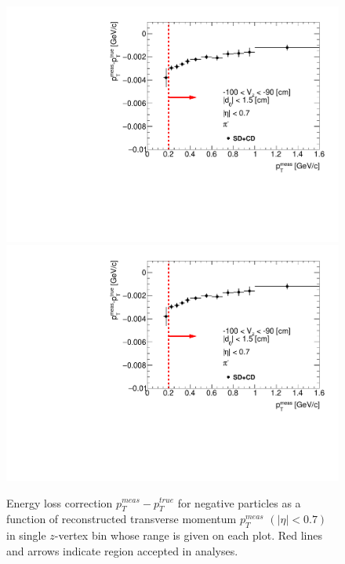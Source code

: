 \begin{figure}[H]
\caption[Energy loss correction for negative particles as a function of reconstructed transverse momentum $p_T^{meas}$.]{Energy loss correction $p_T^{meas}-p_T^{true}$ for negative particles as a function of reconstructed transverse momentum $p_T^{meas}$ $\left(|\eta|<0.7\right)$ in single $z$-vertex bin whose range is given on each plot. Red lines and arrows indicate region accepted in analyses.}\label{fig:energyLossPrimaryNegative}
\parbox{0.329\textwidth}{
  \includegraphics[width=\linewidth,page=123]{graphics/energyLoss/energyLoss3D_OnePrtAlso.pdf}\\
  \includegraphics[width=\linewidth,page=126]{graphics/energyLoss/energyLoss3D_OnePrtAlso.pdf}\\
}
\end{figure}

